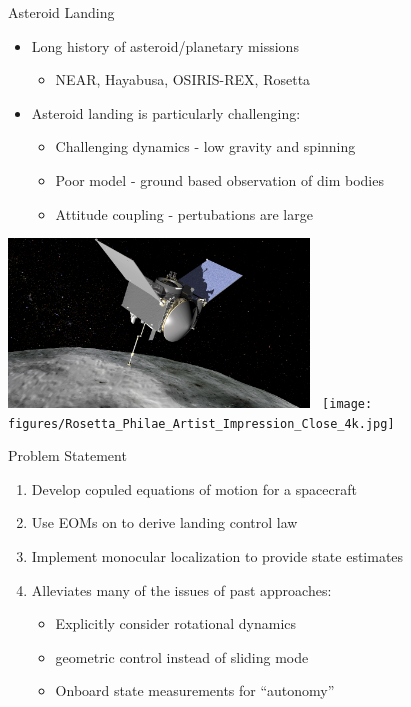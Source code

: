 \documentclass[11pt,professionalfonts]{beamer}
\begin{document}
\begin{frame}{Asteroid Landing}
    \begin{itemize}
        \item Long history of asteroid/planetary missions
            \begin{itemize}
                \item NEAR, Hayabusa, OSIRIS-REX, Rosetta
            \end{itemize}
            \pause
        \item Asteroid landing is particularly challenging:
            \begin{itemize}
                \item<3-> Challenging dynamics - low gravity and spinning
                \item<4-> Poor model - ground based observation of dim bodies
                \item<5-> Attitude coupling - pertubations are large 
            \end{itemize}
    \end{itemize}
    \begin{center}
        \includegraphics[width=0.6\textwidth,height=0.4\textheight,keepaspectratio]{figures/osiris_rex.png}~
        \texttt{[image: figures/Rosetta\_Philae\_Artist\_Impression\_Close\_4k.jpg]}
    \end{center} 
\end{frame}

\begin{frame}{Problem Statement}
    \begin{enumerate}
        \item Develop copuled equations of motion for a spacecraft
        \item Use EOMs on \SE to derive landing control law
        \item Implement monocular localization to provide state estimates
        \item Alleviates many of the issues of past approaches:
            \pause
            \begin{itemize}
                \item Explicitly consider rotational dynamics
                \item \SE geometric control instead of sliding mode
                \item Onboard state measurements for ``autonomy''
            \end{itemize}
    \end{enumerate}
\end{frame}
\end{document}
